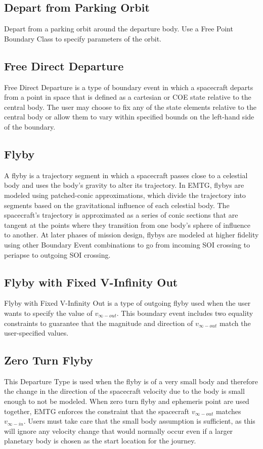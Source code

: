     \subsection{Depart from Parking Orbit}
    \label{sec:depart_from_park_orbit} 
    Depart from a parking orbit around the departure body. Use a Free Point Boundary Class to specify parameters of the orbit. 

    \subsection{Free Direct Departure}
    \label{sec:free_direct_departure}
    Free Direct Departure is a type of boundary event in which a spacecraft departs from a point in space that is defined as a cartesian or \ac{COE} state relative to the central body. The user may choose to fix any of the state elements relative to the central body or allow them to vary within specified bounds on the left-hand side of the boundary. 

    \subsection{Flyby}
    \label{sec:flyby}
    A flyby is a trajectory segment in which a spacecraft passes close to a celestial body and uses the body's gravity to alter its trajectory. In \ac{EMTG}, flybys are modeled using patched-conic approximations, which divide the trajectory into segments based on the gravitational influence of each celestial body. The spacecraft's trajectory is approximated as a series of conic sections that are tangent at the points where they transition from one body's sphere of influence to another. At later phases of mission design, flybys are modeled at higher fidelity using other Boundary Event combinations to go from incoming \ac{SOI} crossing to periapse to outgoing \ac{SOI} crossing.

    \subsection{Flyby with Fixed V-Infinity Out}
    \label{sec:flyby_fixed_vinf_out}
    Flyby with Fixed V-Infinity Out is a type of outgoing flyby used when the user wants to specify the value of $v_{\infty-out}$. This boundary event includes two equality constraints to guarantee that the magnitude and direction of $v_{\infty-out}$ match the user-specified values.

    \subsection{Zero Turn Flyby}
    \label{sec:zero_turn_flyby}
    This Departure Type is used when the flyby is of a very small body and therefore the change in the direction of the spacecraft velocity due to the body is small enough to not be modeled. When zero turn flyby and ephemeris point are used together, \ac{EMTG} enforces the constraint that the spacecraft  $v_{\infty-out}$ matches $v_{\infty-in}$. Users must take care that the small body assumption is sufficient, as this will ignore any velocity change that would normally occur even if a larger planetary body is chosen as the start location for the journey.


